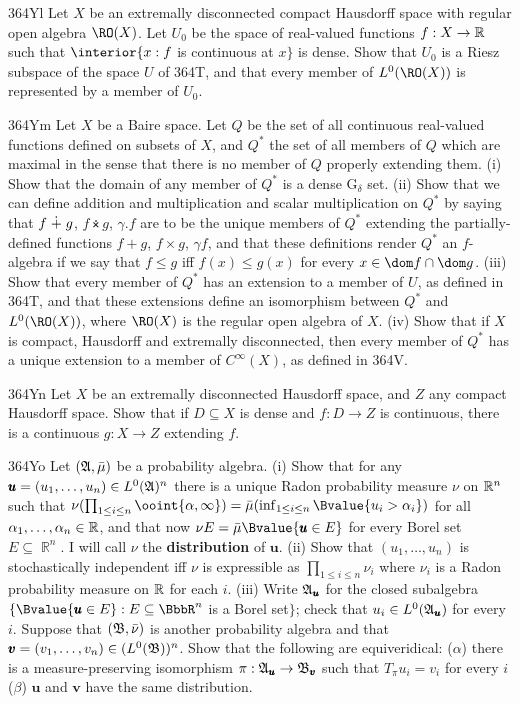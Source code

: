 {\spheader 364Yl Let $X$ be an extremally disconnected compact Hausdorff
space with regular open algebra $\RO(X)$.   Let $U_0$ be the space of
real-valued functions $f:X\to\Bbb R$ such that $\interior\{x:f$ is
continuous at $x\}$ is dense.   Show that $U_0$ is a Riesz subspace of
the space $U$ of 364T, and that every member of $L^0(\RO(X))$ is
represented by a member of $U_0$.

\spheader 364Ym Let $X$ be a Baire space.   Let $Q$ be the set of all
continuous real-valued functions defined on subsets of $X$, and $Q^*$
the set of all members of $Q$ which are maximal in the sense that there
is no member of $Q$ properly extending them.   (i) Show that the domain
of any member of $Q^*$ is a dense G$_{\delta}$ set.   (ii) Show that we
can define addition and multiplication and scalar multiplication on
$Q^*$ by saying that $f\mskip5mu\dot+\mskip5mu g$, $f\dottimes g$, $\gamma.f$ are to
be the unique members of $Q^*$ extending the partially-defined functions
$f+g$, $f\times g$, $\gamma f$, and that these definitions render $Q^*$
an $f$-algebra if we say that $f\le g$ iff $f(x)\le g(x)$ for every
$x\in\dom f\cap\dom g$.   (iii) Show that every member of $Q^*$ has an
extension to a member of $U$, as defined in 364T, and that these
extensions define an isomorphism between $Q^*$ and $L^0(\RO(X))$, where
$\RO(X)$ is the regular open algebra of $X$.   (iv) Show that if $X$ is
compact, Hausdorff and extremally disconnected, then every member of
$Q^*$ has a unique extension to a member of $C^{\infty}(X)$, as defined
in 364V.

\spheader 364Yn Let $X$ be an extremally disconnected Hausdorff space,
and $Z$ any compact Hausdorff space.   Show that if $D\subseteq X$ is
dense and $f:D\to Z$ is continuous, there is a continuous $g:X\to Z$
extending $f$.

\spheader 364Yo
Let $(\frak A,\bar\mu)$ be a probability algebra.
(i) Show that for any $\pmb{u}=(u_1,\ldots,u_n)\in L^0(\frak A)^n$ 
there is a unique Radon probability measure $\nu$ on
$\Bbb R^n$ such that 
$\nu(\prod_{1\le i\le n}\ooint{\alpha,\infty})
=\bar\mu(\inf_{1\le i\le n}\Bvalue{u_i>\alpha_i})$ for all
$\alpha_1,\ldots,\alpha_n\in\Bbb R$, and that now 
$\nu E=\bar\mu\Bvalue{\pmb{u}\in E}$ for every Borel set 
$E\subseteq\BbbR^n$.   
I will call $\nu$ the {\bf distribution} of $\pmb{u}$.
(ii) Show that $(u_1,\ldots,u_n)$ is stochastically
independent iff $\nu$ is expressible as $\prod_{1\le i\le n}\nu_i$ where
$\nu_i$ is a Radon probability measure on $\Bbb R$ for each $i$.
(iii) Write $\frak A_{\pmb{u}}$ for the closed subalgebra
$\{\Bvalue{\pmb{u}\in E}:E\subseteq\BbbR^n$ is a Borel set$\}$;  check that
$u_i\in L^0(\frak A_{\pmb{u}})$ for every $i$.
Suppose that $(\frak B,\bar\nu)$ is another probability algebra and
that $\pmb{v}=(v_1,\ldots,v_n)\in(L^0(\frak B))^n$.
Show that the following are equiveridical:  ($\alpha$) there
is a measure-preserving
isomorphism $\pi:\frak A_{\pmb{u}}\to\frak B_{\pmb{v}}$ such that
$T_{\pi}u_i=v_i$ for every $i$ ($\beta$) $\pmb{u}$ and $\pmb{v}$ have the
same distribution.

}%

